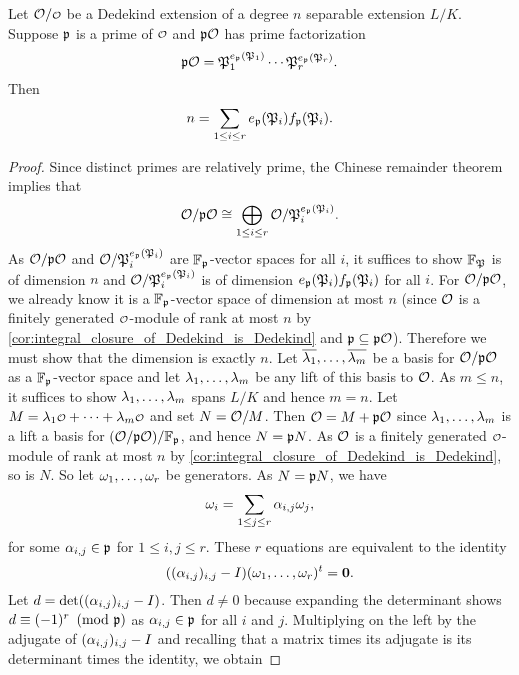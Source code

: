     \begin{theorem*}
      Let $\mc{O}/\smc{O}$ be a Dedekind extension of a degree $n$ separable extension $L/K$. Suppose $\mathfrak{p}$ is a prime of $\smc{O}$ and $\mathfrak{p}\mathcal{O}$ has prime factorization
      \[
        \mathfrak{p}\mathcal{O} = \mathfrak{P}_{1}^{e_{\mathfrak{p}}(\mathfrak{P}_{1})} \cdots \mathfrak{P}_{r}^{e_{\mathfrak{p}}(\mathfrak{P}_{r})}.
      \]
      Then
      \[
        n = \sum_{1 \le i \le r}e_{\mathfrak{p}}(\mathfrak{P}_{i})f_{\mathfrak{p}}(\mathfrak{P}_{i}).
      \]
    \end{theorem*}
    \begin{proof}
      Since distinct primes are relatively prime, the Chinese remainder theorem implies that
      \[
        \mathcal{O}/\mathfrak{p}\mathcal{O} \cong \bigoplus_{1 \le i \le r} \mathcal{O}/\mathfrak{P}_{i}^{e_{\mathfrak{p}}(\mathfrak{P}_{i})}.
      \]
      As $\mathcal{O}/\mathfrak{p}\mathcal{O}$ and $\mathcal{O}/\mathfrak{P}_{i}^{e_{\mathfrak{p}}(\mathfrak{P}_{i})}$ are $\mathbb{F}_{\mathfrak{p}}$-vector spaces for all $i$, it suffices to show $\mathbb{F}_{\mathfrak{P}}$ is of dimension $n$ and $\mathcal{O}/\mathfrak{P}_{i}^{e_{\mathfrak{p}}(\mathfrak{P}_{i})}$ is of dimension $e_{\mathfrak{p}}(\mathfrak{P}_{i})f_{\mathfrak{p}}(\mathfrak{P}_{i})$ for all $i$. For $\mathcal{O}/\mathfrak{p}\mathcal{O}$, we already know it is a $\mathbb{F}_{\mathfrak{p}}$-vector space of dimension at most $n$ (since $\mathcal{O}$ is a finitely generated $\smc{O}$-module of rank at most $n$ by \cref{cor:integral_closure_of_Dedekind_is_Dedekind} and $\mathfrak{p} \subseteq \mathfrak{p}\mathcal{O}$). Therefore we must show that the dimension is exactly $n$. Let $\overline{\lambda_{1}},\ldots,\overline{\lambda_{m}}$ be a basis for $\mathcal{O}/\mathfrak{p}\mathcal{O}$ as a $\mathbb{F}_{\mathfrak{p}}$-vector space and let $\lambda_{1},\ldots,\lambda_{m}$ be any lift of this basis to $\mathcal{O}$. As $m \le n$, it suffices to show $\lambda_{1},\ldots,\lambda_{m}$ spans $L/K$ and hence $m = n$. Let $M = \l_{1}\smc{O}+\cdots+\l_{m}\smc{O}$ and set $N = \mathcal{O}/M$. Then $\mathcal{O} = M+\mathfrak{p}\mathcal{O}$ since $\lambda_{1},\ldots,\lambda_{m}$ is a lift a basis for $(\mathcal{O}/\mathfrak{p}\mathcal{O})/\mathbb{F}_{\mathfrak{p}}$, and hence $N = \mathfrak{p}N$. As $\mathcal{O}$ is a finitely generated $\smc{O}$-module of rank at most $n$ by \cref{cor:integral_closure_of_Dedekind_is_Dedekind}, so is $N$. So let $\omega_{1},\ldots,\omega_{r}$ be generators. As $N = \mathfrak{p}N$, we have
      \[
        \omega_{i} = \sum_{1 \le j \le r}\alpha_{i,j}\omega_{j},
      \]
      for some $\alpha_{i,j} \in \mathfrak{p}$ for $1 \le i,j \le r$. These $r$ equations are equivalent to the identity
      \[
        ((\alpha_{i,j})_{i,j}-I)(\omega_{1},\ldots,\omega_{r})^{t} = \mathbf{0}.
      \]
      Let $d = \det((\alpha_{i,j})_{i,j}-I)$. Then $d \neq 0$ because expanding the determinant shows $d \equiv (-1)^{r} \ \left(\text{mod }\mathfrak{p}\right)$ as $\alpha_{i,j} \in \mathfrak{p}$ for all $i$ and $j$. Multiplying on the left by the adjugate of $(\alpha_{i,j})_{i,j}-I$ and recalling that a matrix times its adjugate is its determinant times the identity, we obtain

\end{proof}
